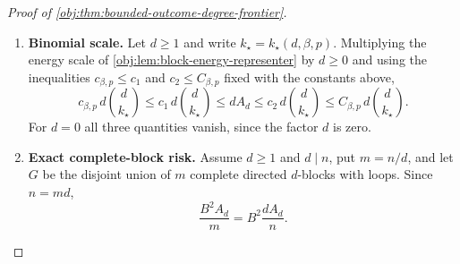 \begin{proof}[Proof of \cref{obj:thm:bounded-outcome-degree-frontier}]
\begin{enumerate}
\item \textbf{Binomial scale.}
Let \(d\ge1\) and write \(k_\star=k_\star(d,\beta,p)\).  Multiplying the energy
scale of \cref{obj:lem:block-energy-representer} by \(d\ge0\) and using the inequalities
\(c_{\beta,p}\le c_1\) and \(c_2\le C_{\beta,p}\) fixed with the constants above,
\[
c_{\beta,p}\,d\binom{d}{k_\star}
\le
c_1\,d\binom{d}{k_\star}
\le
dA_d
\le
c_2\,d\binom{d}{k_\star}
\le
C_{\beta,p}\,d\binom{d}{k_\star}.
\]
For \(d=0\) all three quantities vanish, since the factor \(d\) is zero.

\item \textbf{Exact complete-block risk.}
Assume \(d\ge1\) and \(d\mid n\), put \(m=n/d\), and let \(G\) be the disjoint
union of \(m\) complete directed \(d\)-blocks with loops.  Since \(n=md\),
\[
\frac{B^2A_d}{m}=B^2\frac{dA_d}{n}.
\]


\end{enumerate}
\end{proof}
